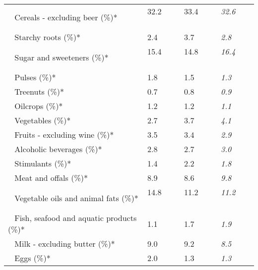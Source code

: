\begin{tabular}{L{3.9cm} R{1cm} R{1cm} R{1cm}}
	 ~ Cereals - excluding beer (\%)* & 32.2 ~ \ \ & 33.4 ~ \ \ & \textit{32.6} ~ \ \ \\ 
	 ~ Starchy roots (\%)* & 2.4 ~ \ \ & 3.7 ~ \ \ & \textit{2.8} ~ \ \ \\ 
	 ~ Sugar and sweeteners (\%)* & 15.4 ~ \ \ & 14.8 ~ \ \ & \textit{16.4} ~ \ \ \\ 
	 ~ Pulses (\%)* & 1.8 ~ \ \ & 1.5 ~ \ \ & \textit{1.3} ~ \ \ \\ 
	 ~ Treenuts (\%)* & 0.7 ~ \ \ & 0.8 ~ \ \ & \textit{0.9} ~ \ \ \\ 
	 ~ Oilcrops (\%)* & 1.2 ~ \ \ & 1.2 ~ \ \ & \textit{1.1} ~ \ \ \\ 
	 ~ Vegetables (\%)* & 2.7 ~ \ \ & 3.7 ~ \ \ & \textit{4.1} ~ \ \ \\ 
	 ~ Fruits - excluding wine (\%)* & 3.5 ~ \ \ & 3.4 ~ \ \ & \textit{2.9} ~ \ \ \\ 
	 ~ Alcoholic beverages (\%)* & 2.8 ~ \ \ & 2.7 ~ \ \ & \textit{3.0} ~ \ \ \\ 
	 ~ Stimulants (\%)* & 1.4 ~ \ \ & 2.2 ~ \ \ & \textit{1.8} ~ \ \ \\ 
	 ~ Meat and offals (\%)* & 8.9 ~ \ \ & 8.6 ~ \ \ & \textit{9.8} ~ \ \ \\ 
	 ~ Vegetable oils and animal fats (\%)* & 14.8 ~ \ \ & 11.2 ~ \ \ & \textit{11.2} ~ \ \ \\ 
	 ~ Fish, seafood and aquatic products (\%)* & 1.1 ~ \ \ & 1.7 ~ \ \ & \textit{1.9} ~ \ \ \\ 
	 ~ Milk - excluding butter (\%)* & 9.0 ~ \ \ & 9.2 ~ \ \ & \textit{8.5} ~ \ \ \\ 
	 ~ Eggs (\%)* & 2.0 ~ \ \ & 1.3 ~ \ \ & \textit{1.3} ~ \ \ \\ 
       \toprule
      \end{tabular}
      \clearpage
{}
